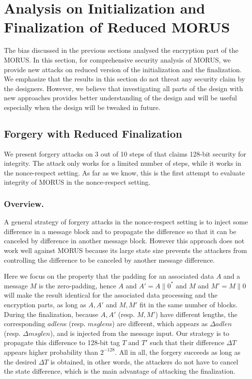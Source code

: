 \section{Analysis on Initialization and Finalization of Reduced MORUS}
\label{sec/IniFin}

The bias discussed in the previous sections analysed the encryption part of the MORUS. In this section, for comprehensive security analysis of MORUS, we provide new attacks on reduced version of the initialization and the finalization. We emphasize that the results in this section do not threat any security claim by the designers. However, we believe that investigating all parts of the design with new approaches provides better understanding of the design and will be useful especially when the design will be tweaked in future.

\subsection{Forgery with Reduced Finalization}
We present forgery attacks on 3 out of 10 steps of  that claims 128-bit security for integrity. The attack only works for a limited number of steps, while it works in the nonce-respect setting. As far as we know, this is the first attempt to evaluate integrity of MORUS in the nonce-respect setting.

\subsubsection{Overview.}
A general strategy of forgery attacks in the nonce-respect setting is to inject some difference in a message block and to propagate the difference so that it can be canceled by difference in another message block. However this approach does not work well against MORUS because its large state size prevents the attackers from controlling the difference to be canceled by another message difference.

Here we focus on the property that the padding for an associated data $A$ and a message $M$ is the zero-padding, hence $A$ and $A'=A\|0^*$ and $M$ and $M'=M\|0$ will make the result identical for the associated data processing and the encryption parts, as long as $A,A'$ and $M,M'$ fit in the same number of blocks. During the finalization, because $A,A'$ (resp. $M,M'$) have different lengths, the corresponding $adlen$s (resp. $msglen$s) are different, which appears as $\Delta adlen$ (resp. $\Delta msglen$), and is injected from the message input. Our strategy is to propagate this difference to 128-bit tag $T$ and $T'$ such that their difference $\Delta T$ appears higher probability than $2^{-128}$. All in all, the forgery succeeds as long as the desired $\Delta T$ is obtained, in other words, the attackers do not have to cancel the state difference, which is the main advantage of attacking the finalization.

